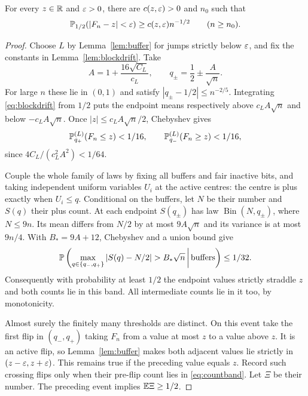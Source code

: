 \begin{proposition}\label{prop:oddswindow}
For every $z\in\mathbb R$ and $\varepsilon>0$, there are $c(z,\varepsilon)>0$ and $n_0$ such that
\begin{equation}\label{eq:oddswindow}
 \mathbb P_{1/2}(|F_n-z|<\varepsilon)\ge c(z,\varepsilon)n^{-1/2}
 \qquad(n\ge n_0).
\end{equation}
\end{proposition}
\begin{proof}
Choose $L$ by Lemma~\ref{lem:buffer} for jumps strictly below $\varepsilon$, and fix the constants in Lemma~\ref{lem:blockdrift}. Take
\[
 A=1+\frac{16\sqrt{C_L}}{c_L},\qquad
 q_\pm=\frac12\pm\frac A{\sqrt n}.
\]
For large $n$ these lie in $(0,1)$ and satisfy $|q_\pm-1/2|\le n^{-2/5}$. Integrating \eqref{eq:blockdrift} from $1/2$ puts the endpoint means respectively above $c_LA\sqrt n$ and below $-c_LA\sqrt n$. Once $|z|\le c_LA\sqrt n/2$, Chebyshev gives
\begin{equation}\label{eq:straddle}
 \mathbb P_{q_+}^{(L)}(F_n\le z)<1/16,\qquad
 \mathbb P_{q_-}^{(L)}(F_n\ge z)<1/16,
\end{equation}
since $4C_L/(c_L^2A^2)<1/64$.

Couple the whole family of laws by fixing all buffers and fair inactive bits, and taking independent uniform variables $U_i$ at the active centres: the centre is plus exactly when $U_i\le q$. Conditional on the buffers, let $N$ be their number and $S(q)$ their plus count. At each endpoint $S(q_\pm)$ has law $\operatorname{Bin}(N,q_\pm)$, where $N\le9n$. Its mean differs from $N/2$ by at most $9A\sqrt n$ and its variance is at most $9n/4$. With $B_*=9A+12$, Chebyshev and a union bound give
\begin{equation}\label{eq:countband}
 \Pp\left(\max_{q\in\{q_-,q_+\}}|S(q)-N/2|>B_*\sqrt n
       \,\middle|\,\text{buffers}\right)\le1/32.
\end{equation}
Consequently with probability at least $1/2$ the endpoint values strictly straddle $z$ and both counts lie in this band. All intermediate counts lie in it too, by monotonicity.

Almost surely the finitely many thresholds are distinct. On this event take the first flip in $(q_-,q_+)$ taking $F_n$ from a value at most $z$ to a value above $z$. It is an active flip, so Lemma~\ref{lem:buffer} makes both adjacent values lie strictly in $(z-\varepsilon,z+\varepsilon)$. This remains true if the preceding value equals $z$. Record such crossing flips only when their pre-flip count lies in \eqref{eq:countband}. Let $\Xi$ be their number. The preceding event implies $\mathbb E\Xi\ge1/2$.


\end{proof}
